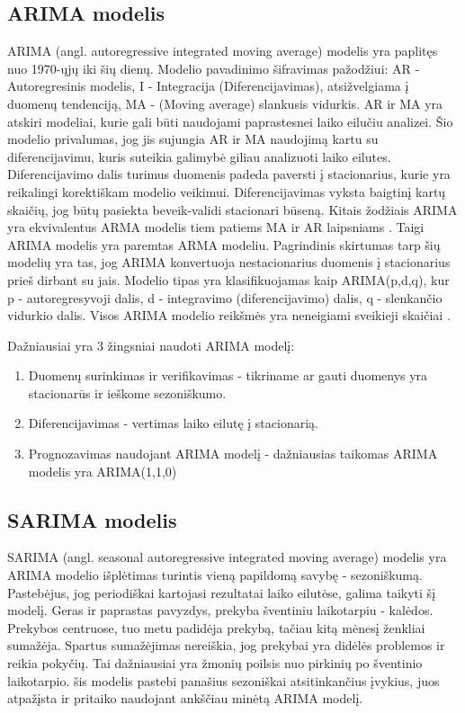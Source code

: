 \documentclass{VUMIFInfKursinis}
\begin{document}
\subsection {ARIMA modelis}
ARIMA (angl. autoregressive integrated moving average) modelis yra paplitęs nuo 1970-ųjų iki šių dienų. Modelio pavadinimo šifravimas
pažodžiui: AR - Autoregresinis modelis, I - Integracija (Diferencijavimas), atsižvelgiama į duomenų tendenciją, MA - (Moving average) slankusis vidurkis.
AR ir MA yra atskiri modeliai, kurie gali būti naudojami paprastesnei laiko eilučiu analizei. Šio modelio privalumas, jog jis sujungia AR ir MA naudojimą kartu su
diferencijavimu, kuris suteikia galimybė giliau analizuoti laiko eilutes. Diferencijavimo dalis turimus duomenis padeda paversti į stacionarius, 
kurie yra reikalingi korektiškam modelio veikimui. Diferencijavimas vyksta baigtinį kartų skaičių, jog būtų pasiekta beveik-validi stacionari būseną. 
Kitais žodžiais ARIMA yra ekvivalentus ARMA modelis tiem patiems MA ir AR laipsniams \cite{hua2020bitcoin}. Taigi ARIMA modelis yra paremtas ARMA modeliu. 
Pagrindinis skirtumas tarp šių modelių yra tas, jog ARIMA konvertuoja nestacionarius duomenis į stacionarius prieš dirbant su jais. Modelio tipas yra 
klasifikuojamas kaip ARIMA(p,d,q), kur p - autoregresyvoji dalis, d - integravimo (diferencijavimo) dalis, q - slenkančio vidurkio dalis. Visos ARIMA modelio
reikšmės yra neneigiami sveikieji skaičiai \cite{mondal2014study}.

Dažniausiai yra 3 žingsniai naudoti ARIMA modelį:
\begin{enumerate}
  \item Duomenų surinkimas ir verifikavimas - tikriname ar gauti duomenys yra stacionarūs ir ieškome sezoniškumo.
  \item Diferencijavimas - vertimas laiko eilutę į stacionarią.
  \item Prognozavimas naudojant ARIMA modelį - dažniausias taikomas ARIMA modelis yra ARIMA(1,1,0)
\end{enumerate}

\subsection {SARIMA modelis}
SARIMA (angl. seasonal autoregressive integrated moving average) modelis yra ARIMA modelio išplėtimas turintis vieną papildomą savybę - sezoniškumą\cite{carl2020ethereum}. 
Pastebėjus, jog periodiškai kartojasi rezultatai laiko eilutėse, galima taikyti šį modelį. Geras ir paprastas pavyzdys, prekyba šventiniu laikotarpiu - kalėdos.
Prekybos centruose, tuo metu padidėja prekybą, tačiau kitą mėnesį ženkliai sumažėja. Spartus sumažėjimas nereiškia, jog prekybai yra didėlės problemos ir reikia pokyčių.
Tai dažniausiai yra žmonių poilsis nuo pirkinių po šventinio laikotarpio. šis modelis pastebi panašius sezoniškai atsitinkančius įvykius, juos atpažįsta ir pritaiko naudojant
ankščiau minėtą ARIMA modelį.
\end{document}
